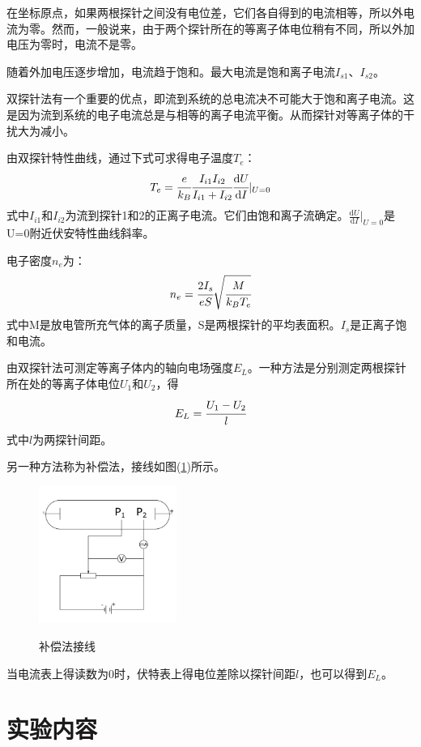 \documentclass[a4paper]{article}
\begin{document}
在坐标原点，如果两根探针之间没有电位差，它们各自得到的电流相等，所以外电流为零。然而，一般说来，由于两个探针所在的等离子体电位稍有不同，所以外加电压为零时，电流不是零。

随着外加电压逐步增加，电流趋于饱和。最大电流是饱和离子电流$I_{s1}$、$I_{s2}$。

双探针法有一个重要的优点，即流到系统的总电流决不可能大于饱和离子电流。这是因为流到系统的电子电流总是与相等的离子电流平衡。从而探针对等离子体的干扰大为减小。

由双探针特性曲线，通过下式可求得电子温度$T_e$：
\begin{equation}
T_e = \cfrac{e}{k_B}\cfrac{I_{i1}I_{i2}}{I_{i1}+I_{i2}}\cfrac{\text{d}U}{\text{d}I}|_{U=0}\label{eq10}
\end{equation}
式中$I_{i1}$和$I_{i2}$为流到探针1和2的正离子电流。它们由饱和离子流确定。$\frac{\text{d}U}{\text{d}I}|_{U=0}$是U=0附近伏安特性曲线斜率。

电子密度$n_e$为：
\begin{equation}
n_e = \cfrac{2I_s}{eS}\sqrt{\cfrac{M}{k_BT_e}}\label{eq11}
\end{equation}
式中M是放电管所充气体的离子质量，S是两根探针的平均表面积。$I_s$是正离子饱和电流。

由双探针法可测定等离子体内的轴向电场强度$E_L$。一种方法是分别测定两根探针所在处的等离子体电位$U_1$和$U_2$，得
\begin{equation}
E_L = \cfrac{U_1 - U_2}{l}\label{eq12}
\end{equation}
式中$l$为两探针间距。

另一种方法称为补偿法，接线如图(\ref{fig6})所示。
\begin{figure}[!h]
\centering
\includegraphics[width=0.4\textwidth]{fig/fig6.pdf}\\
\caption{补偿法接线}\label{fig6}
\end{figure}

当电流表上得读数为0时，伏特表上得电位差除以探针间距$l$，也可以得到$E_L$。

\section{实验内容}
\end{document}
